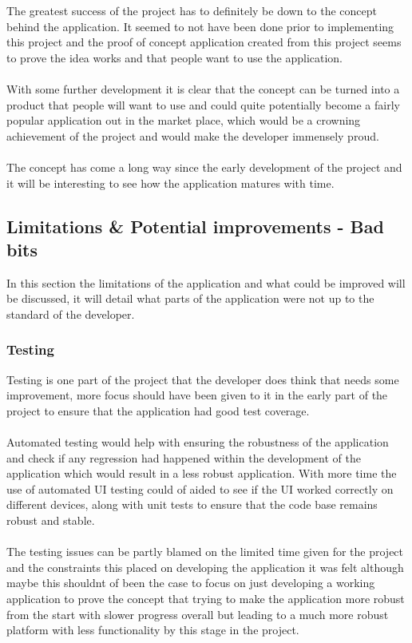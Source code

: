The greatest success of the project has to definitely be down to the concept behind the application. It seemed to not have been done prior to implementing this project and the proof of concept application created from this project seems to prove the idea works and that people want to use the application.\\
\\
With some further development it is clear that the concept can be turned into a product that people will want to use and could quite potentially become a fairly popular application out in the market place, which would be a crowning achievement of the project and would make the developer immensely proud.\\
\\
The concept has come a long way since the early development of the project and it will be interesting to see how the application matures with time.

\subsection{Limitations \& Potential improvements - Bad bits}

In this section the limitations of the application and what could be improved will be discussed, it will detail what parts of the application were not up to the standard of the developer.

\subsubsection{Testing}

Testing is one part of the project that the developer does think that needs some improvement, more focus should have been given to it in the early part of the project to ensure that the application had good test coverage.\\
\\
Automated testing would help with ensuring the robustness of the application and check if any regression had happened within the development of the application which would result in a less robust application. With more time the use of automated UI testing could of aided to see if the UI worked correctly on different devices, along with unit tests to ensure that the code base remains robust and stable.\\
\\
The testing issues can be partly blamed on the limited time given for the project and the constraints this placed on developing the application it was felt although maybe this shouldnt of been the case to focus on just developing a working application to prove the concept that trying to make the application more robust from the start with slower progress overall but leading to a much more robust platform with less functionality by this stage in the project.

